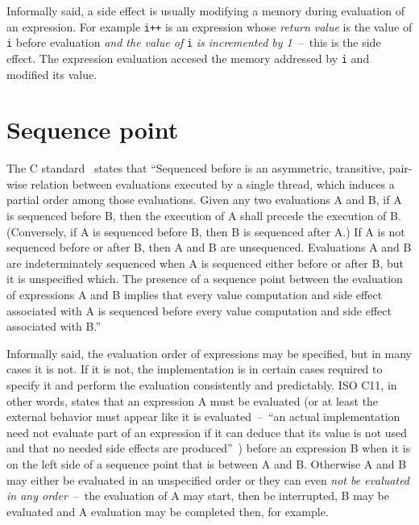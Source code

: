 Informally said, a side effect is usually modifying a memory during evaluation of an expression. For example \verb|i++| is an expression whose \emph{return value} is the value of \verb|i| before evaluation \emph{and the value of }\verb|i|\emph{ is incremented by 1}~--~this is the side effect. The expression evaluation accesed the memory addressed by \verb|i| and modified its value.

\section{Sequence point}
The C standard~\cite{WG14N1570} states that ``Sequenced before is an asymmetric, transitive, pair-wise relation between evaluations
executed by a single thread, which induces a partial order among those evaluations.
Given any two evaluations A and B, if A is sequenced before B, then the execution of A
shall precede the execution of B. (Conversely, if A is sequenced before B, then B is
sequenced after A.) If A is not sequenced before or after B, then A and B are
unsequenced. Evaluations A and B are indeterminately sequenced when A is sequenced
either before or after B, but it is unspecified which. The presence of a sequence point
 between the evaluation of expressions A and B implies that every value computation and
side effect associated with A is sequenced before every value computation and side effect
associated with B.''

Informally said, the evaluation order of expressions may be specified, but in many cases it is not. If it is not, the implementation is in certain cases required to specify it and perform the evaluation consistently and predictably. ISO C11, in other words, states that an expression A must be evaluated (or at least the external behavior must appear like it is evaluated~--~``an actual implementation need not evaluate part of an expression if it can deduce that its value is not used and that no needed side effects are produced''~\cite{WG14N1570}) before an expression B when it is on the left side of a sequence point that is between A and B. Otherwise A and B may either be evaluated in an unspecified order or they can even \emph{not be evaluated in any order}~--~the evaluation of A may start, then be interrupted, B may be evaluated and A evaluation may be completed then, for example.

